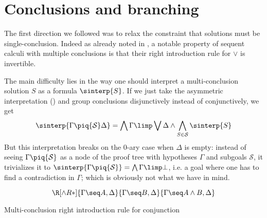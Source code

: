 \section{Conclusions and branching}

The first direction we followed was to relax the constraint that solutions must
be single-conclusion. Indeed as already noted in , a
notable property of sequent calculi with multiple conclusions is that their
right introduction rule for $\lor$ is invertible.

The main difficulty lies in the way one should interpret a multi-conclusion
solution $S$ as a formula $\sinterp{S}$. If we just take the asymmetric
interpretation () and group conclusions disjunctively instead of
conjunctively, we get
$$
\sinterp{\Gamma \piq{\mathcal{S}} \Delta} =
\bigwedge \Gamma \limp \bigvee \Delta \land \bigwedge_{S \in \mathcal{S}}{\sinterp{S}}
$$
But this interpretation breaks on the 0-ary case when $\Delta$ is empty: instead
of seeing $\Gamma \piq{\mathcal{S}}$ as a node of the proof tree with hypotheses
$\Gamma$ and subgoals $\mathcal{S}$, it trivializes it to $\sinterp{\Gamma
\piq{\mathcal{S}}} = \bigwedge \Gamma \limp \bot$, i.e. a goal where one has to
find a contradiction in $\Gamma$; which is obviously not what we have in mind.

\begin{marginfigure}
  $$
  \R[\land R*]
    {\Gamma \seq A, \Delta}
    {\Gamma \seq B, \Delta}
    {\Gamma \seq A \land B, \Delta}
  $$
  \caption{Multi-conclusion right introduction rule for conjunction}
\end{marginfigure}

